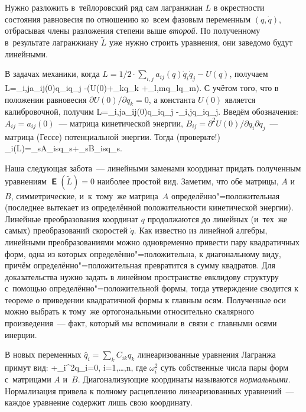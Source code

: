 \documentclass[a4paper,11pt]{article}
\def\[#1\]{\begin{align*}#1\end{align*}}
\newcommand\slashfrac[2]{{#1/#2}}
\theoremstyle{definition}
\begin{document}
Нужно разложить в~тейлоровский ряд сам лагранжиан $L$ в окрестности состояния
равновесия по отношению ко~всем фазовым переменным $(q,\dot q)$, отбрасывая
члены разложения степени выше \emph{второй.} По полученному в~результате
лагранжиану $\tilde L$ уже нужно строить уравнения, они заведомо будут
линейными.

В задачах механики, когда
$L=\slashfrac12\cdot\sum_{i,j}a_{ij}(q)\dot q_i\dot q_j-U(q)$, получаем
	\[
	\tilde L=\sum_{i,j}a_{ij}(0)\dot q_i\dot q_j
		-\left(U(0)+\sum_kq_k
		+\sum_{l,m}q_lq_m\right).
	\]
С учётом того, что в положении равновесия $\slashfrac{\partial U(0)}{\partial
q_k}=0$, а константа $U(0)$ является калибровочной, получим
	\[
	\tilde L=\sum_{i,j}a_{ij}(0)\dot q_i\dot q_j
		-\sum_{i,j}q_iq_j.
	\]
Введём обозначения: $A_{ij}=a_{ij}(0)$~— матрица кинетической энергии,
$B_{ij}=\slashfrac{\partial^2U(0)}{\partial q_i\partial q_j}$~— матрица (Гессе)
потенциальной энергии. Тогда (проверьте!)
	\[
	\mbfsansE_i(\tilde L)=\sum_sA_{is}\ddot q_s+\sum_sB_{is}q_s.
	\]

Наша следующая забота~— линейными заменами координат придать полученным
уравнениям $\mbfsansE(\tilde L)=0$ наиболее простой вид. Заметим, что обе
матрицы, $A$ и $B$, симметрические, и~к~тому~же матрица~$A$
определённо"=положительная (последнее вытекает из определённой положительности
кинетической энергии). Линейные преобразования координат $q$ продолжаются до
линейных (и~тех~же самых) преобразований скоростей $\dot q$. Как известно из
линейной алгебры, линейными преобразованиями можно одновременно привести пару
квадратичных форм, одна из которых определённо"=положительна, к диагональному
виду, причём определённо"=положительная превратится в сумму квадратов. Для
доказательства нужно задать в линейном пространстве евклидову структуру
с~помощью определённо"=положительной формы, тогда утверждение сводится к
теореме о приведении квадратичной формы к главным осям. Полученные оси можно
выбрать к тому~же ортогональными относительно скалярного произведения~— факт,
который мы вспоминали в~связи с~главными осями инерции.

В новых переменных $\hat q_i=\sum_k C_{ik}q_k$ линеаризованные уравнения
Лагранжа примут вид:
	\[
	\ddot{\hat q_i}+\omega_i^2\hat q_i=0,
	\quad
	i=1,\ldots,n,
	\]
где $\omega_i^2$ суть собственные числа пары форм с~матрицами $A$ и~$B$.
Диагонализующие координаты называются \emph{нормальными.} Нормализация привела
к полному расцеплению линеаризованных уравнений~— каждое уравнение содержит
лишь свою координату.
\end{document}
